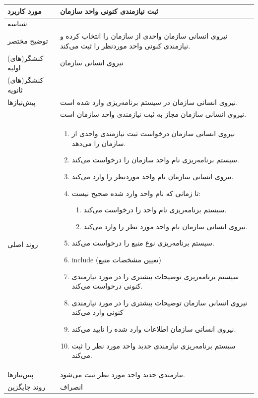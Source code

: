 \begin{table}[H]
	\centering
	\begin{tabular}{|p{3cm}|p{10cm}|}
		\hline
		
		مورد کاربرد	& ثبت نیازمندی کنونی واحد سازمان  \\
		\hline
		
		شناسه & 
		\stepcounter{usecase_ID}
		
		\arabic{usecase_ID} \\
		
		\hline
		
		توضیح مختصر & نیروی انسانی سازمان واحدی از سازمان را انتخاب کرده و نیازمندی کنونی واحد موردنظر را ثبت می‌کند. \\
		\hline
		
		کنشگر(های) اولیه& نیروی انسانی سازمان  \\
		\hline
		
		کنشگر(های) ثانویه&  \\
		\hline
		
		پیش‌نیازها &
		نیروی انسانی سازمان در سیستم برنامه‌ریزی وارد شده است.\\
		& نیروی انسانی سازمان مجاز به ثبت نیازمندی واحد سازمان است. \\
		\hline
		
		روند اصلی &
		\begin{enumerate}[topsep=0cm,leftmargin=0.5cm]
			\item نیروی انسانی سازمان درخواست ثبت نیازمندی واحدی از سازمان را می‌دهد.
			\item سیستم برنامه‌ریزی نام واحد سازمان را درخواست می‌کند.
			\item نیروی انسانی سازمان نام واحد موردنظر را وارد می‌کند.
			\item تا زمانی که نام واحد وارد شده صحیح نیست: 
			\begin{enumerate}[topsep=0cm,leftmargin=0.5cm]
				\item سیستم برنامه‌ریزی نام واحد را درخواست می‌کند. 
				\item نیروی انسانی سازمان نام واحد مورد نظر را وارد می‌کند. 
			\end{enumerate}
			\item سیستم برنامه‌ریزی نوع منبع را درخواست می‌کند.
			\item include (تعیین مشخصات منبع)
			\item سیستم برنامه‌ریزی توضیحات بیشتری را در مورد نیازمندی کنونی درخواست می‌کند.
			\item نیروی انسانی سازمان توضیحات بیشتری را در مورد نیازمندی کنونی وارد می‌کند
			\item نیروی انسانی سازمان اطلاعات وارد شده را تایید می‌کند.
			\item سیستم برنامه‌ریزی نیازمندی جدید واحد مورد نظر را ثبت می‌کند.
		\end{enumerate} \\
		\hline
		
		پس‌نیازها &
		نیازمندی جدید واحد مورد نظر ثبت می‌شود. \\		
		\hline
		روند جایگزین
		& انصراف \\
		\hline
		
	\end{tabular}
\end{table}

